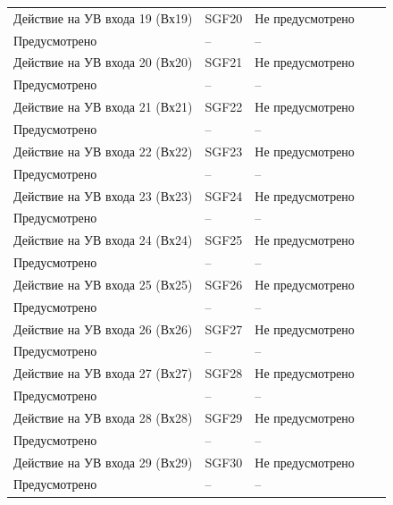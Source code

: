 \begin{longtable}{|>{\centering\arraybackslash}m{5.3cm}|>{\centering\arraybackslash}m{3.3cm}|>{\centering\arraybackslash}m{4.2cm}|>{\centering\arraybackslash}m{1.8cm}|>{\centering\arraybackslash}m{1cm}|}
\hline
\centering Действие на УВ входа 19 (Вх19)  & \centering SGF20 & \centering Не предусмотрено \\ Предусмотрено & \centering -- & \centering \arraybackslash -- \\
\hline
\centering Действие на УВ входа 20 (Вх20)  & \centering SGF21 & \centering Не предусмотрено \\ Предусмотрено & \centering -- & \centering \arraybackslash -- \\
\hline
\centering Действие на УВ входа 21 (Вх21)  & \centering SGF22 & \centering Не предусмотрено \\ Предусмотрено & \centering -- & \centering \arraybackslash -- \\
\hline
\centering Действие на УВ входа 22 (Вх22)  & \centering SGF23 & \centering Не предусмотрено \\ Предусмотрено & \centering -- & \centering \arraybackslash -- \\
\hline
\centering Действие на УВ входа 23 (Вх23)  & \centering SGF24 & \centering Не предусмотрено \\ Предусмотрено & \centering -- & \centering \arraybackslash -- \\
\hline
\centering Действие на УВ входа 24 (Вх24)  & \centering SGF25 & \centering Не предусмотрено \\ Предусмотрено & \centering -- & \centering \arraybackslash -- \\
\hline
\centering Действие на УВ входа 25 (Вх25)  & \centering SGF26 & \centering Не предусмотрено \\ Предусмотрено & \centering -- & \centering \arraybackslash -- \\
\hline
\centering Действие на УВ входа 26 (Вх26)  & \centering SGF27 & \centering Не предусмотрено \\ Предусмотрено & \centering -- & \centering \arraybackslash -- \\
\hline
\centering Действие на УВ входа 27 (Вх27)  & \centering SGF28 & \centering Не предусмотрено \\ Предусмотрено & \centering -- & \centering \arraybackslash -- \\
\hline
\centering Действие на УВ входа 28 (Вх28)  & \centering SGF29 & \centering Не предусмотрено \\ Предусмотрено & \centering -- & \centering \arraybackslash -- \\
\hline
\centering Действие на УВ входа 29 (Вх29)  & \centering SGF30 & \centering Не предусмотрено \\ Предусмотрено & \centering -- & \centering \arraybackslash -- \\

\end{longtable}
